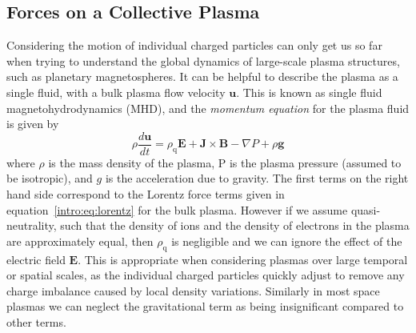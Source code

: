 \subsection{Forces on a Collective Plasma}
Considering the motion of individual charged particles can only get us so far when trying to understand the global dynamics of large-scale plasma structures, such as planetary magnetospheres. It can be helpful to describe the plasma as a single fluid, with a bulk plasma flow velocity $\boldsymbol{u}$. This is known as single fluid magnetohydrodynamics (MHD), and the \textit{momentum equation} for the plasma fluid is given by
\begin{equation}\label{intro:eq:momentum}
\rho\frac{d\boldsymbol{u}}{dt} = \rho_\mathrm{q}\boldsymbol{E} + \boldsymbol{J}\times\boldsymbol{B} - \nabla P + \rho \boldsymbol{g}
\end{equation}
where $\rho$ is the mass density of the plasma, P is the plasma pressure (assumed to be isotropic), and $g$ is the acceleration due to gravity. The first terms on the right hand side correspond to the Lorentz force terms given in equation~\ref{intro:eq:lorentz} for the bulk plasma. However if we assume quasi-neutrality, such that the density of ions and the density of electrons in the plasma are approximately equal, then $\rho_\mathrm{q}$ is negligible and we can ignore the effect of the electric field $\boldsymbol{E}$. This is appropriate when considering plasmas over large temporal or spatial scales, as the individual charged particles quickly adjust to remove any charge imbalance caused by local density variations. Similarly in most space plasmas we can neglect the gravitational term as being insignificant compared to other terms.

